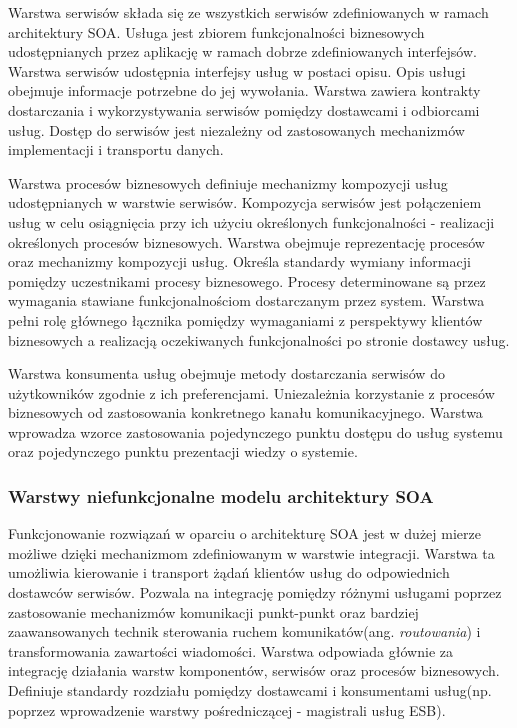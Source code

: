 			Warstwa serwisów składa się ze wszystkich serwisów zdefiniowanych w ramach architektury SOA. Usługa jest zbiorem funkcjonalności biznesowych udostępnianych przez aplikację w ramach dobrze zdefiniowanych interfejsów. Warstwa serwisów udostępnia interfejsy usług w postaci opisu. Opis usługi obejmuje informacje potrzebne do jej wywołania. Warstwa zawiera kontrakty dostarczania i wykorzystywania serwisów pomiędzy dostawcami i odbiorcami usług. Dostęp do serwisów jest niezależny od zastosowanych mechanizmów implementacji i transportu danych. 

			Warstwa procesów biznesowych definiuje mechanizmy kompozycji usług udostępnianych w warstwie serwisów. Kompozycja serwisów jest połączeniem usług w celu osiągnięcia przy ich użyciu określonych funkcjonalności - realizacji określonych procesów biznesowych. Warstwa obejmuje reprezentację procesów oraz mechanizmy kompozycji usług. Określa standardy wymiany informacji pomiędzy uczestnikami procesy biznesowego. Procesy determinowane są przez wymagania stawiane funkcjonalnościom dostarczanym przez system. Warstwa pełni rolę głównego łącznika pomiędzy wymaganiami z perspektywy klientów biznesowych a realizacją oczekiwanych funkcjonalności po stronie dostawcy usług.

			Warstwa konsumenta usług obejmuje metody dostarczania serwisów do użytkowników zgodnie z ich preferencjami. Uniezależnia korzystanie z procesów biznesowych od zastosowania konkretnego kanału komunikacyjnego. Warstwa wprowadza wzorce zastosowania pojedynczego punktu dostępu do usług systemu oraz pojedynczego punktu prezentacji wiedzy o systemie.

		\subsubsection{Warstwy niefunkcjonalne modelu architektury SOA}

			Funkcjonowanie rozwiązań w oparciu o architekturę SOA jest w dużej mierze możliwe dzięki mechanizmom zdefiniowanym w warstwie integracji. Warstwa ta umożliwia kierowanie i transport żądań klientów usług do odpowiednich dostawców serwisów. Pozwala na integrację pomiędzy różnymi usługami poprzez zastosowanie mechanizmów komunikacji punkt-punkt oraz bardziej zaawansowanych technik sterowania ruchem komunikatów(ang. \textit{routowania}) i transformowania zawartości wiadomości. Warstwa odpowiada głównie za integrację działania warstw komponentów, serwisów oraz procesów biznesowych. Definiuje standardy rozdziału pomiędzy dostawcami i konsumentami usług(np. poprzez wprowadzenie warstwy pośredniczącej - magistrali usług ESB)\cite{Arsanjani07}.

